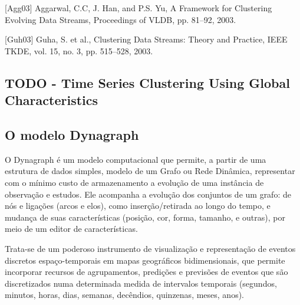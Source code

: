 [Agg03]
Aggarwal, C.C, J. Han, and P.S. Yu, A Framework for Clustering Evolving Data Streams, Proceedings of VLDB, pp. 81–92, 2003.

[Guh03]
Guha, S. et al., Clustering Data Streams: Theory and Practice, IEEE TKDE, vol. 15, no. 3, pp. 515–528, 2003.


\subsection{TODO - Time Series Clustering Using Global Characteristics}




\subsection{O modelo Dynagraph}

O Dynagraph \cite{dynagraph} é um modelo computacional que permite, a partir de uma estrutura de dados simples, modelo de um Grafo ou Rede Dinâmica, representar com o mínimo custo de armazenamento a evolução de uma instância de observação e estudos. Ele acompanha a evolução dos conjuntos de um grafo: de nós e ligações (arcos e elos), como inserção/retirada ao longo do tempo, e mudança de suas características (posição, cor, forma, tamanho, e outras), por meio de um editor de características.

Trata-se de um poderoso instrumento de visualização e representação de eventos discretos espaço-temporais em mapas geográficos bidimensionais, que permite incorporar recursos de agrupamentos, predições e previsões de eventos que são discretizados numa determinada medida de intervalos temporais (segundos, minutos, horas, dias, semanas, decêndios, quinzenas, meses, anos).

